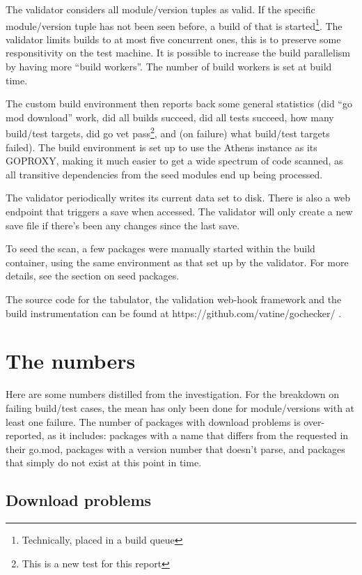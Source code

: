 \documentclass[a4paper]{paper}
\begin{document}


The validator considers all module/version tuples as valid. If the
specific module/version tuple has not been seen before, a build of
that is started\footnote{Technically, placed in a build queue}. The
validator limits builds to at most five concurrent ones, this is to
preserve some responsitivity on the test machine. It is possible to
increase the build parallelism by having more ``build workers''. The
number of build workers is set at build time.

The custom build environment then reports back some general statistics
(did ``go mod download'' work, did all builds succeed, did all tests
succeed, how many build/test targets, did go vet pass\footnote{This is
  a new test for this report}, and (on failure) what build/test targets
failed). The build environment is set up to use the Athens instance as
its GOPROXY, making it much easier to get a wide spectrum of code
scanned, as all transitive dependencies from the seed modules end up
being processed.

The validator periodically writes its current data set to disk. There
is also a web endpoint that triggers a save when accessed. The
validator will only create a new save file if there's been any changes
since the last save.

To seed the scan, a few packages were manually started within the
build container, using the same environment as that set up by the
validator. For more details, see the section on seed packages.

The source code for the tabulator, the validation web-hook framework
and the build instrumentation can be found at
https://github.com/vatine/gochecker/ .

\section{The numbers}

Here are some numbers distilled from the investigation. For the
breakdown on failing build/test cases, the mean has only been done for
module/versions with at least one failure. The number of packages with
download problems is over-reported, as it includes: packages with a
name that differs from the requested in their go.mod, packages with a
version number that doesn't parse, and packages that simply do not
exist at this point in time.



\subsection{Download problems}
\end{document}

